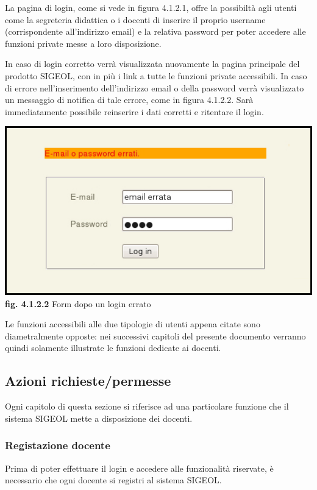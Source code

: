 \documentclass[11pt,a4paper]{article}
\begin{document}
La pagina di login, come si vede in figura 4.1.2.1, offre la possibiltà agli utenti come la segreteria didattica o i docenti di inserire il proprio username (corrispondente all'indirizzo email) e la relativa password per poter accedere alle funzioni private messe a loro disposizione.

In caso di login corretto verrà visualizzata nuovamente la pagina principale del prodotto SIGEOL, con in più i link a tutte le funzioni private accessibili.
In caso di errore nell'inserimento dell'indirizzo email o della password verrà visualizzato un messaggio di notifica di tale errore, come in figura 4.1.2.2.
Sarà immediatamente possibile reinserire i dati corretti e ritentare il login.

\begin{center}
	\includegraphics[scale=0.5]{images/login_errato.jpg}\\
	\textbf{fig. 4.1.2.2} Form dopo un login errato\\
\end{center}

Le funzioni accessibili alle due tipologie di utenti appena citate sono diametralmente opposte: nei successivi capitoli del presente documento verranno quindi solamente illustrate le funzioni dedicate ai docenti.
\subsection{Azioni richieste/permesse}
Ogni capitolo di questa sezione si riferisce ad una particolare funzione che il sistema SIGEOL mette a disposizione dei docenti.
\subsubsection{Registazione docente}
Prima di poter effettuare il login e accedere alle funzionalità riservate, è necessario che ogni docente si registri al sistema SIGEOL.
\end{document}
